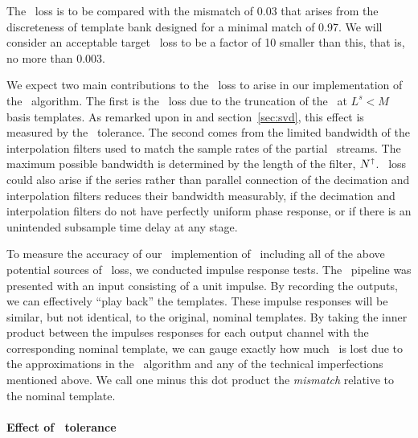 The \SNR\ loss is to be compared with the mismatch of 0.03 that arises from the
discreteness of template bank designed for a minimal match of 0.97.  We will consider
an acceptable target \SNR\ loss to be a factor of 10 smaller than this, that is, no more
than 0.003.

We expect two main contributions to the \SNR\ loss to arise in our
implementation of the \lloid\ algorithm.  The first is the \SNR\ loss due to
the truncation of the \SVD\ at $L^s < M$ basis templates.  As remarked upon in
\citet{Cannon:2010p10398} and section~\ref{sec:svd}, this effect is measured by
the \SVD\ tolerance.  The second comes from the limited bandwidth of the
interpolation filters used to match the sample rates of the partial \SNR\ streams.
The maximum possible bandwidth is determined by the length of the filter,
$N^\shortuparrow$.  \SNR\ loss could also arise if the series rather than parallel
connection of the decimation and interpolation filters reduces their bandwidth
measurably, if the decimation and interpolation filters do not have perfectly uniform
phase response, or if there is an unintended subsample time delay at any stage.

To measure the accuracy of our \gstreamer\ implemention of \lloid\ including all of
the above potential sources of \SNR\ loss, we conducted impulse response tests.  The
\gstreamer\ pipeline was presented with an input consisting of a unit impulse.  By
recording the outputs, we can effectively ``play back'' the templates.  These impulse
responses will be similar, but not identical, to the original, nominal templates.  By
taking the inner product between the impulses responses for each output 
channel with the corresponding nominal template, we can gauge exactly how much \SNR\
is lost due to the approximations in the \lloid\ algorithm and any of the technical
imperfections mentioned above.  We call one minus this dot product the \emph{mismatch}
relative to the nominal template.

\paragraph{Effect of \SVD\ tolerance}

